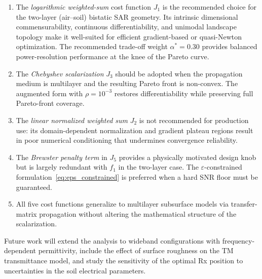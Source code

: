 \documentclass[journal]{IEEEtran}
\begin{document}
\begin{enumerate}
  \item The \emph{logarithmic weighted-sum} cost function $J_1$ is the
    recommended choice for the two-layer (air--soil) bistatic SAR geometry. Its
    intrinsic dimensional commensurability, continuous differentiability, and
    unimodal landscape topology make it well-suited for efficient gradient-based
    or quasi-Newton optimization. The recommended trade-off weight
    $\alpha^* = 0.30$ provides balanced power-resolution performance at the
    knee of the Pareto curve.

  \item The \emph{Chebyshev scalarization} $J_3$ should be adopted when the
    propagation medium is multilayer and the resulting Pareto front is non-convex.
    The augmented form with $\rho = 10^{-3}$ restores differentiability while
    preserving full Pareto-front coverage.

  \item The \emph{linear normalized weighted sum} $J_2$ is not recommended for
    production use: its domain-dependent normalization and gradient plateau
    regions result in poor numerical conditioning that undermines convergence
    reliability.

  \item The \emph{Brewster penalty term} in $J_5$ provides a physically
    motivated design knob but is largely redundant with $f_1$ in the two-layer
    case. The $\varepsilon$-constrained formulation~\eqref{eq:eps_constrained}
    is preferred when a hard SNR floor must be guaranteed.

  \item All five cost functions generalize to multilayer subsurface models via
    transfer-matrix propagation without altering the mathematical structure of
    the scalarization.
\end{enumerate}

Future work will extend the analysis to wideband configurations with frequency-
dependent permittivity, include the effect of surface roughness on the TM
transmittance model, and study the sensitivity of the optimal Rx position to
uncertainties in the soil electrical parameters.
\end{document}
